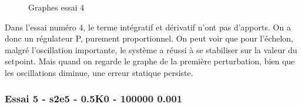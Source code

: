 \begin{figure}[H]
    \centering
    \caption{Graphes essai 4}
    \label{fig:essai-4}
\end{figure}

Dans l'essai numéro 4, le terme intégratif et dérivatif n'ont pas d'apports.
On a donc un régulateur P, purement proportionnel. On peut voir que pour 
l'échelon, malgré l'oscillation importante, le système a réussi à se stabiliser
sur la valeur du setpoint. Mais quand on regarde le graphe de la première perturbation,
bien que les oscillations diminue, une erreur statique persiste.

\subsubsection{Essai 5 - s2e5 - 0.5K0 - 100000 0.001}

